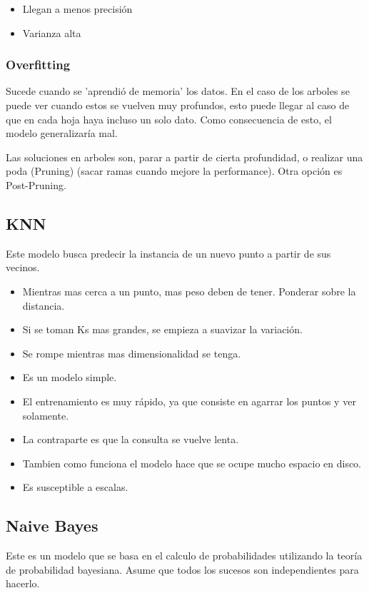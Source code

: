 \documentclass[titlepage,a4paper]{article}
\begin{document}
\begin{itemize}
    \item Llegan a menos precisión
    \item Varianza alta
\end{itemize}

\subsubsection*{Overfitting}

Sucede cuando se 'aprendió de memoria' los datos. En el caso de los arboles se puede ver cuando estos se vuelven muy profundos, esto puede llegar al caso de que en cada hoja haya incluso un solo dato. Como consecuencia de esto, el modelo generalizaría mal.

Las soluciones en arboles son, parar a partir de cierta profundidad, o realizar una poda (Pruning)  (sacar ramas cuando mejore la performance). Otra opción es Post-Pruning.

\subsection{KNN}
Este modelo busca predecir la instancia de un nuevo punto a partir de sus vecinos.

\begin{itemize}
    \item Mientras mas cerca a un punto, mas peso deben de tener. Ponderar sobre la distancia.
    \item Si se toman Ks mas grandes, se empieza a suavizar la variación.
    \item Se rompe mientras mas dimensionalidad se tenga.
    \item Es un modelo simple.
    \item El entrenamiento es muy rápido, ya que consiste en agarrar los puntos y ver solamente.
    \item La contraparte es que la consulta se vuelve lenta.
    \item Tambien como funciona el modelo hace que se ocupe mucho espacio en disco.
    \item Es susceptible a escalas.
\end{itemize}



\subsection{Naive Bayes}
Este es un modelo que se basa en el calculo de probabilidades utilizando la teoría de probabilidad bayesiana. Asume que todos los sucesos son independientes para hacerlo.
\end{document}
